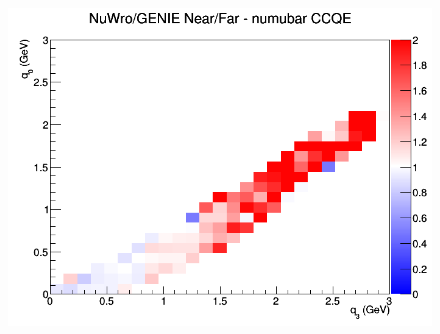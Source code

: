 \documentclass[12pt]{article}
\begin{document}
\begin{figure}[h]
\endminipage
{}
\includegraphics[width=\linewidth]{q0_q3/nominal/ratios/CCQE_NuWro_GENIE_numubar_NF_q3_q0.png}
\endminipage
\newline
\end{figure}
\clearpage
\end{document}
